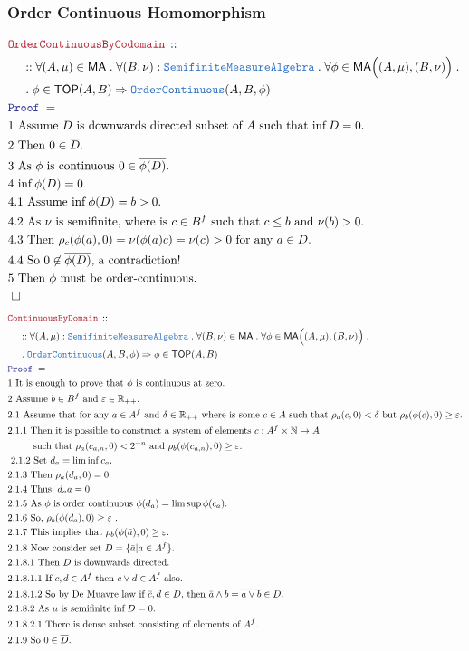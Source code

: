 \documentclass[12pt]{scrartcl}
\newcommand{\TYPE}[1]{\textcolor{NavyBlue}{\mathtt{#1}}}
\newcommand{\LOGIC}[1]{\textcolor{Blue}{\mathtt{#1}}}
\newcommand{\THM}[1]{\textcolor{Maroon}{\mathtt{#1}}}
\renewcommand{\.}{\; . \;}
\newcommand{\Theorem}[2]{& \THM{#1} \, :: \, #2 \\ & \Proof = \\ }
\newcommand{\NewLine}{\\ & \kern 1pc}
\newcommand{\Page}[1]{ \begin{align*} #1 \end{align*}   }
\newcommand{\Imply}{\Rightarrow}
\newcommand{\Reals}{\mathbb{R} }
\newcommand{\Nat}{\mathbb{N} }
\newcommand{\QED}{\; \square}
\newcommand{\EndProof}{& \QED \\}
\newcommand{\Proof}{\LOGIC{Proof} \; }
\newcommand{\Explain}[1]{& \text{#1.} \\}
\newcommand{\ExplainFurther}[1]{& \text{#1} \\}
\newcommand{\Exclaim}[1]{& \text{#1!} \\}
\newcommand{\oC}{\TYPE{OrderContinuous}}
\newcommand{\TOP}{\mathsf{TOP}}
\newcommand{\Semifinite}{\TYPE{Semifinite}}
\newcommand{\MA}{\TYPE{MeasureAlgebra}}
\newcommand{\ma}{\mathsf{MA}}
\begin{document}
\subsubsection{Order Continuous Homomorphism}
\Page{
	\Theorem{OrderContinuousByCodomain}
	{
		\NewLine ::		
		\forall (A,\mu) \in \ma \.
		\forall (B,\nu)  : \Semifinite\MA \.
		\forall \phi \in \ma\Big((A,\mu),(B,\nu)\Big) \. \NewLine \.
		\phi \in \TOP(A,B) \Imply \oC(A,B,\phi)
	}
	\Explain{1 Assume $D$ is downwards directed subset of $A$ such that $\inf D = 0$}
	\Explain{2 Then $0 \in \overline{D}$}
	\Explain{3 As $\phi$ is continuous $0 \in \overline{\phi(D)}$}
	\Explain{4 $\inf \phi(D) = 0$}
	\Explain{4.1 Assume $\inf \phi(D) = b > 0$}
	\Explain{4.2 As $\nu$ is semifinite, where is $c \in B^f$ such that $c \le b$ 
		and $\nu(b) > 0$}
	\Explain{4.3 Then $\rho_c(\phi(a),0) = \nu(\phi(a)c) = \nu(c) > 0$ for any $a \in D$}
	\Exclaim{4.4 So $0 \not \in \overline{\phi(D)}$, a contradiction}
	\Explain{5 Then $\phi$ must be order-continuous}
	\EndProof
}\Page{
	\Theorem{ContinuousByDomain}
	{
		\NewLine ::		
		\forall (A,\mu) : \Semifinite\MA \.
		\forall (B,\nu)  \in \ma \.
		\forall \phi \in \ma\Big((A,\mu),(B,\nu)\Big) \. \NewLine \.
		\oC(A,B,\phi) \Imply \phi \in \TOP(A,B)
	}
	\Explain{1 It is enough to prove that $\phi$ is continuous at zero}
	\Explain{2 Assume $b \in B^f$ and $\varepsilon \in \Reals_{++}$}
	\Explain{2.1 Assume that for any $a \in A^f$ and $\delta \in \Reals_{++}$
		where is some $c \in A$ such that $\rho_a(c,0) < \delta$ but $\rho_b(\phi(c),0) \ge \varepsilon$}
	\ExplainFurther{2.1.1  Then it is possible to construct a system of elements $c : A^f \times \Nat \to A$}
	\Explain{ $\quad \quad$ such that $\rho_a(c_{a,n},0) < 2^{-n}$ and 
		$\rho_b(\phi(c_{a,n}),0) \ge \varepsilon$}
	\Explain{ 2.1.2  Set $d_a = \liminf c_a$}
	\Explain{2.1.3 Then $\rho_a(d_a,0) = 0$}
	\Explain{2.1.4 Thus, $d_a a = 0$}
	\Explain{2.1.5 As $\phi$ is order continuous $\phi(d_a) = \limsup \phi(c_a)$}
	\Explain{2.1.6 So, $\rho_b(\phi(d_a),0) \ge \varepsilon$ }
	\Explain{2.1.7 This implies that $\rho_b(\phi(\bar a),0) \ge \varepsilon$}
	\Explain{2.1.8 Now consider set $D = \{ \bar a | a \in A^f \}$}
	\Explain{2.1.8.1 Then $D$ is downwards directed}
	\Explain{2.1.8.1.1 If $c,d \in A^f$ then $c \vee d \in A^f$ also}
	\Explain{2.1.8.1.2 So by De Muavre  law if $\bar c, \bar d \in D$, then 
	$\bar a \wedge \bar b = \overline{a \vee b} \in D$}
	\Explain{2.1.8.2 As $\mu$ is semifinite $\inf D = 0$}
	\Explain{2.1.8.2.1 There is dense subset consisting of elements of $A^f$}
	\Explain{2.1.9 So $0 \in \overline{D}$}
}
\end{document}

